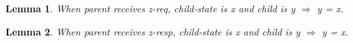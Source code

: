 \documentclass{article}
\newtheorem{lemma}{Lemma}
\begin{document}
\begin{lemma}
When parent receives z-req, child-state is x and child is y $\Rightarrow$ y = x.
\label{Req=}
\end{lemma}

%

\begin{lemma}
When parent receives z-resp, child-state is x and child is y $\Rightarrow$ y = x.
\label{Resp=}
\end{lemma}

%
\end{document}
